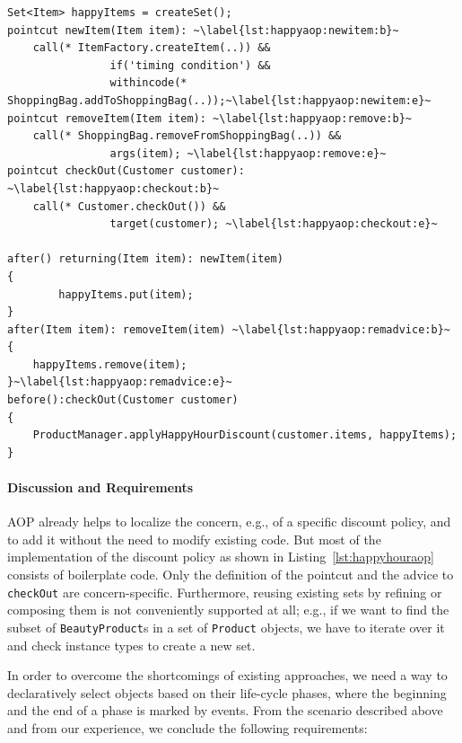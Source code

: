 \begin{lstlisting}[float=h, caption={An Aspectj implementation of happy-hour discount rule}, label={lst:happyhouraop}]
Set<Item> happyItems = createSet();
pointcut newItem(Item item): ~\label{lst:happyaop:newitem:b}~
	call(* ItemFactory.createItem(..)) && 
				if('timing condition') && 
				withincode(* ShoppingBag.addToShoppingBag(..));~\label{lst:happyaop:newitem:e}~
pointcut removeItem(Item item): ~\label{lst:happyaop:remove:b}~
	call(* ShoppingBag.removeFromShoppingBag(..)) && 
				args(item); ~\label{lst:happyaop:remove:e}~
pointcut checkOut(Customer customer): ~\label{lst:happyaop:checkout:b}~
	call(* Customer.checkOut()) && 
				target(customer); ~\label{lst:happyaop:checkout:e}~

after() returning(Item item): newItem(item)
{
		happyItems.put(item);
}
after(Item item): removeItem(item) ~\label{lst:happyaop:remadvice:b}~
{
	happyItems.remove(item);
}~\label{lst:happyaop:remadvice:e}~
before():checkOut(Customer customer)
{
	ProductManager.applyHappyHourDiscount(customer.items, happyItems);
}
\end{lstlisting}

\paragraph{Discussion and Requirements}

AOP already helps to localize the concern, e.g., of a specific discount policy, and to add it without the need to modify existing code.
But most of the implementation of the discount policy as shown in Listing~\ref{lst:happyhouraop} consists of boilerplate code. Only the definition of the pointcut and the advice to \lstinline{checkOut} are concern-specific.
Furthermore, reusing existing sets by refining or composing them is not conveniently supported at all; e.g., if we want to find the subset of \lstinline{BeautyProduct}s in a set of \lstinline{Product} objects, we have to iterate over it and check instance types to create a new set.

In order to overcome the shortcomings of existing approaches, we need a way to declaratively select objects based on their life-cycle phases, where the beginning and the end of a phase is marked by events. From the scenario described above and from our experience, we conclude the following requirements:

